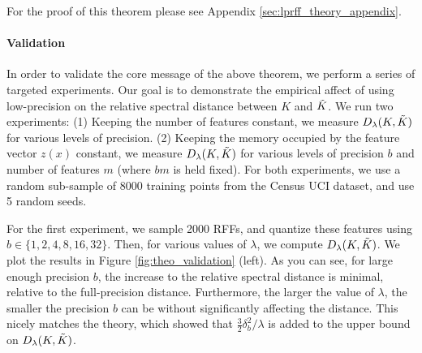


For the proof of this theorem please see Appendix \ref{sec:lprff_theory_appendix}.\\

\paragraph{Validation} In order to validate the core message of the above theorem, we perform a series of targeted experiments. Our goal is to demonstrate the empirical affect of using low-precision on the relative spectral distance between $K$ and $\tilde{K}$. We run two experiments: (1) Keeping the number of features constant, we measure $D_{\lambda}(K,\tilde{K})$ for various levels of precision. (2) Keeping the memory occupied by the feature vector $z(x)$ constant, we measure $D_{\lambda}(K,\tilde{K})$ for various levels of precision $b$ and number of features $m$ (where $bm$ is held fixed). For both experiments, we use a random sub-sample of $8000$ training points from the Census UCI dataset, and use 5 random seeds.

For the first experiment, we sample 2000 RFFs, and quantize these features using $b \in \{1,2,4,8,16,32\}$.  Then, for various values of $\lambda$, we compute $D_{\lambda}(K,\tilde{K})$.  We plot the results in Figure \ref{fig:theo_validation} (left). As you can see, for large enough precision $b$, the increase to the relative spectral distance is minimal, relative to the full-precision distance. Furthermore, the larger the value of $\lambda$, the smaller the precision $b$ can be without significantly affecting the distance. This nicely matches the theory, which showed that $\frac{3}{2}\delta_b^2/\lambda$ is added to the upper bound on $D_{\lambda}(K,\tilde{K})$.

